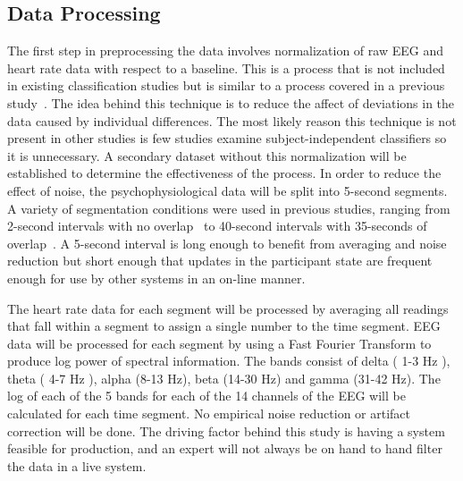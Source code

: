 \documentclass[11pt]{article}
\begin{document}
\subsection{Data Processing}
The first step in preprocessing the data involves normalization of raw EEG and heart rate data with respect to a baseline. This is a process that is not included in existing classification studies but is similar to a process covered in a previous study~\cite{Smith}. The idea behind this technique is to reduce the affect of deviations in the data caused by individual differences. The most likely reason this technique is not present in other studies is few studies examine subject-independent classifiers so it is unnecessary. A secondary dataset without this normalization will be established to determine the effectiveness of the process. In order to reduce the effect of noise, the psychophysiological data will be split into 5-second segments. A variety of segmentation conditions were used in previous studies, ranging from 2-second intervals with no overlap~\cite{Smith} to 40-second intervals with 35-seconds of overlap~\cite{Wang_Z}. A 5-second interval is long enough to benefit from averaging and noise reduction but short enough that updates in the participant state are frequent enough for use by other systems in an on-line manner. 

The heart rate data for each segment will be processed by averaging all readings that fall within a segment to assign a single number to the time segment. EEG data will be processed for each segment by using a Fast Fourier Transform to produce log power of spectral information. The bands consist of delta ( 1-3 Hz ), theta ( 4-7 Hz ), alpha (8-13 Hz), beta (14-30 Hz) and gamma (31-42 Hz). The log of each of the 5 bands for each of the 14 channels of the EEG will be calculated for each time segment. No empirical noise reduction or artifact correction will be done. The driving factor behind this study is having a system feasible for production, and an expert will not always be on hand to hand filter the data in a live system.
\end{document}
